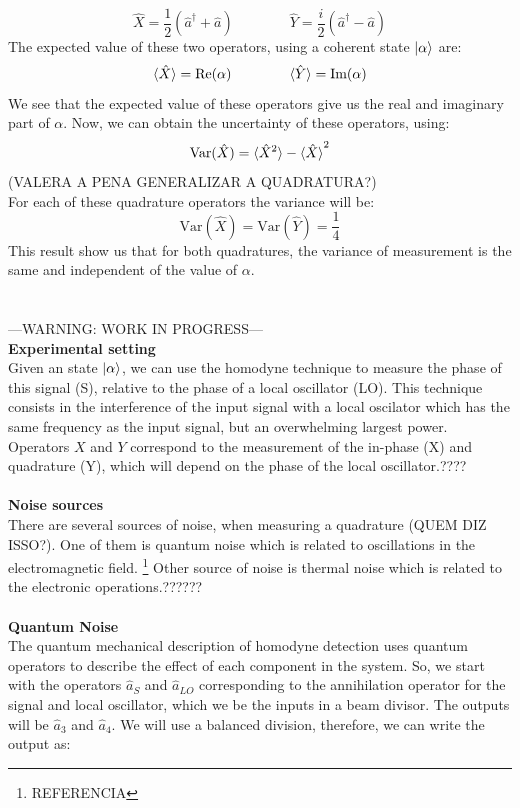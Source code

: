 $$
\hat{X} = \frac{1}{2} \left( \hat{a}^\dagger + \hat{a} \right)
\qquad
\qquad
\hat{Y} = \frac{i}{2} \left( \hat{a}^\dagger - \hat{a} \right)
$$
The expected value of these two operators, using a coherent state $\ket{\alpha}$ are:
$$
\braket{\hat{X}} = \textrm{Re}(\alpha) \qquad \qquad
\braket{\hat{Y}} = \textrm{Im}(\alpha)
$$
We see that the expected value of these operators give us the real and imaginary part of $\alpha$. Now, we can obtain the uncertainty of these operators, using:
$$
\textrm{Var}(\hat{X}) = \braket{\hat{X}^2} - \braket{\hat{X}}^2
$$
(VALERA A PENA GENERALIZAR A QUADRATURA?)\\
For each of these quadrature operators the variance will be:
$$
\textrm{Var}(\hat{X}) = \textrm{Var}(\hat{Y}) = \frac{1}{4}
$$
This result show us that for both quadratures, the variance of measurement is the same and independent of the value of $\alpha$.\\
%
%
%
\\
\\
---WARNING: WORK IN PROGRESS---\\
{\bf Experimental setting}\\
Given an state $\ket{\alpha}$, we can use the homodyne technique to measure the phase of this signal (S), relative to the phase of a local oscillator (LO).
This technique consists in the interference of the input signal with a local oscilator which has the same frequency as the input signal, but an overwhelming largest power.\\
Operators $X$ and $Y$ correspond to the measurement of the in-phase (X) and quadrature (Y), which will depend on the phase of the local oscillator.????
\\
\\
{\bf Noise sources}\\
There are several sources of noise, when measuring a quadrature (QUEM DIZ ISSO?). One of them is quantum noise which is related to oscillations in the electromagnetic field.
\footnote{REFERENCIA}
Other source of noise is thermal noise which is related to the electronic operations.??????\\
\\
{\bf Quantum Noise}\\
The quantum mechanical description of homodyne detection uses quantum operators to describe the effect of each component in the system. So, we start with the operators $\hat{a}_S$ and $\hat{a}_{LO}$ corresponding to the annihilation operator for the signal and local oscillator, which we be the inputs in a beam divisor. The outputs will be $\hat{a}_3$ and $\hat{a}_4$. We will use a balanced division, therefore, we can write the output as:
